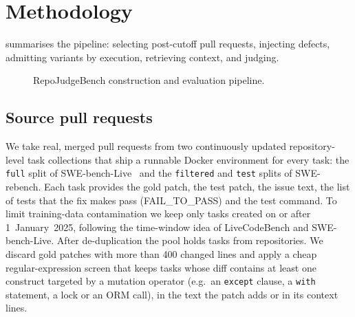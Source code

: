 \section{Methodology}
\label{sec:method}

 summarises the pipeline: selecting post-cutoff pull
requests, injecting defects, admitting variants by execution, retrieving
context, and judging.

\begin{figure}[t]
\centering
\small
{}
\caption{RepoJudgeBench construction and evaluation pipeline.}
\label{fig:pipeline}
\end{figure}

\subsection{Source pull requests}
We take real, merged pull requests from two continuously updated
repository-level task collections that ship a runnable Docker environment for
every task: the \texttt{full} split of
SWE-bench-Live~\cite{zhang2025swebenchlive} and the \texttt{filtered} and
\texttt{test} splits of SWE-rebench.  Each task provides the gold patch, the
test patch, the issue text, the list of tests that the fix makes pass
(FAIL\_TO\_PASS) and the test command.  To limit training-data contamination we
keep only tasks created on or after 1~January~2025, following the time-window
idea of LiveCodeBench and SWE-bench-Live.  After de-duplication the pool holds
\NPoolInstances{} tasks from \NPoolRepos{} repositories.  We discard gold patches
with more than 400 changed lines and apply a cheap regular-expression screen that
keeps tasks whose diff contains at least one construct targeted by a mutation
operator (e.g.\ an \texttt{except} clause, a \texttt{with} statement, a lock or
an ORM call), in the text the patch adds or in its context lines.

